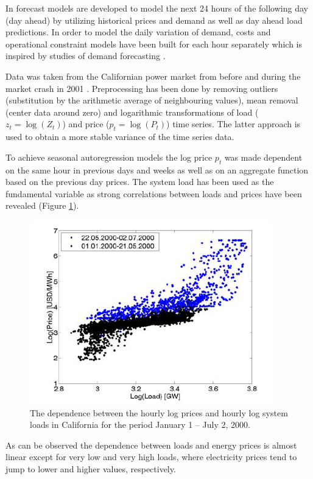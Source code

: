 In \cite{weron2005forecasting} forecast models are developed to model the next 24 hours of the following day (day ahead) by utilizing historical prices and demand as well as day ahead load predictions. In order to model the daily variation of demand, costs and operational constraint models have been built for each hour separately which is inspired by studies of demand forecasting \cite{bunn2000forecasting}. 

Data was taken from the Californian power market from before and during the market crash in 2001 \cite{weron2005forecasting}. Preprocessing has been done by removing outliers (substitution by the arithmetic average of neighbouring values), mean removal (center data around zero) and logarithmic transformations of load ($z_t = \log(Z_t)$) and price ($p_t = \log(P_t)$) time series. The latter approach is used to obtain a more stable variance of the time series data. 

To achieve seasonal autoregression models the log price $p_t$ was made dependent on the same hour in previous days and weeks as well as on an aggregate function based on the previous day prices. The system load has been used as the fundamental variable as strong correlations between loads and prices have been revealed (Figure \ref{fig:log_loads_vs_log_prices}). 

\begin{figure}[htbp]
	\centering
		\includegraphics{figures/state_of_the_art/log_loads_vs_log_prices.PNG}
	\caption{The dependence between the
hourly log prices and hourly log system
loads in California for the period January 1
– July 2, 2000. \cite{weron2005forecasting}}
	\label{fig:log_loads_vs_log_prices}
\end{figure}

As can be observed the dependence between loads and energy prices is almost linear except for very low and very high loads, where electricity prices tend to jump to lower and higher values, respectively. 

